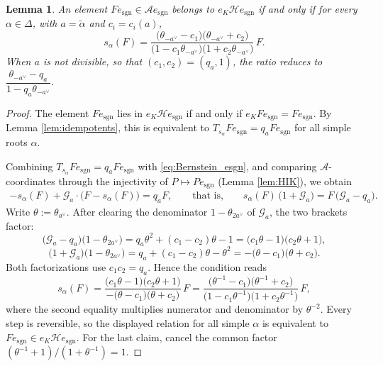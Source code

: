 \documentclass[12pt]{article}
\numberwithin{equation}{section}
\newtheorem{lemma}[theorem]{Lemma}
\theoremstyle{definition}
\theoremstyle{remark}
\theoremstyle{plain}
\begin{document}
\begin{lemma}\label{lem:H_e_sgn}
An element $F e_{\mathrm{sgn}}\in \mathcal{A}e_{\mathrm{sgn}}$ belongs to $e_K \mathcal{H} e_{\mathrm{sgn}}$ if and only if for every $\alpha \in \Delta$, with $a = \tilde\alpha$ and $c_i = c_i(a)$,
$$s_{\alpha}(F) = \frac{\big(\theta_{-a^\vee} - c_1\big)\big(\theta_{-a^\vee} + c_2\big)}{\big(1 - c_1\theta_{-a^\vee}\big)\big(1 + c_2\theta_{-a^\vee}\big)}\, F.$$
When $a$ is not divisible, so that $(c_1, c_2) = (q_a, 1)$, the ratio reduces to $\dfrac{\theta_{-a^\vee} - q_a}{1 - q_a\theta_{-a^\vee}}$.
\end{lemma}
\begin{proof}
The element $F e_{\mathrm{sgn}}$ lies in $e_K \mathcal{H} e_{\mathrm{sgn}}$ if and only if $e_{K}F e_{\mathrm{sgn}} = F e_{\mathrm{sgn}}$. By Lemma \ref{lem:idempotents}, this is equivalent to $T_{s_{\alpha}} F e_{\mathrm{sgn}} = q_a F e_{\mathrm{sgn}}$ for all simple roots $\alpha$.

Combining $T_{s_{\alpha}} F e_{\mathrm{sgn}} = q_a F e_{\mathrm{sgn}}$ with \eqref{eq:Bernstein_esgn}, and comparing $\mathcal{A}$-coordinates through the injectivity of $P \mapsto Pe_{\mathrm{sgn}}$ (Lemma \ref{lem:HIK}), we obtain
\begin{align*}
-s_\alpha(F) + \mathcal{G}_a\cdot\big(F - s_\alpha(F)\big) = q_a F, \qquad \text{that is,} \qquad s_\alpha(F)\,\big(1 + \mathcal{G}_a\big) = F\,\big(\mathcal{G}_a - q_a\big).
\end{align*}
Write $\theta := \theta_{a^\vee}$. After clearing the denominator $1 - \theta_{2a^\vee}$ of $\mathcal{G}_a$, the two brackets factor:
$$\big(\mathcal{G}_a - q_a\big)\big(1-\theta_{2a^\vee}\big) = q_a\theta^2 + (c_1-c_2)\theta - 1 = \big(c_1\theta - 1\big)\big(c_2\theta + 1\big),$$
$$\big(1 + \mathcal{G}_a\big)\big(1-\theta_{2a^\vee}\big) = q_a + (c_1-c_2)\theta - \theta^2 = -\big(\theta - c_1\big)\big(\theta + c_2\big).$$
Both factorizations use $c_1c_2 = q_a$. Hence the condition reads
$$s_\alpha(F) = \frac{\big(c_1\theta-1\big)\big(c_2\theta+1\big)}{-\big(\theta-c_1\big)\big(\theta+c_2\big)}\,F = \frac{\big(\theta^{-1} - c_1\big)\big(\theta^{-1} + c_2\big)}{\big(1 - c_1\theta^{-1}\big)\big(1 + c_2\theta^{-1}\big)}\,F,$$
where the second equality multiplies numerator and denominator by $\theta^{-2}$. Every step is reversible, so the displayed relation for all simple $\alpha$ is equivalent to $F e_{\mathrm{sgn}} \in e_K\mathcal{H}e_{\mathrm{sgn}}$. For the last claim, cancel the common factor $(\theta^{-1}+1)/(1+\theta^{-1}) = 1$.
\end{proof}
\end{document}
